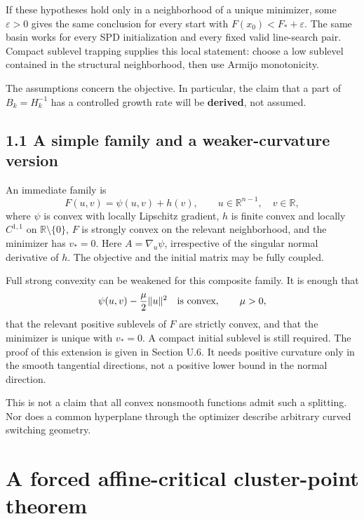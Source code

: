 If these hypotheses hold only in a neighborhood of a unique minimizer,
some \(\varepsilon>0\) gives the same conclusion for every start with
\(F(x_0)<F_*+\varepsilon\). The same basin works for every SPD
initialization and every fixed valid line-search pair. Compact sublevel
trapping supplies this local statement: choose a low sublevel contained
in the structural neighborhood, then use Armijo monotonicity.

The assumptions concern the objective. In particular, the claim that a
part of \(B_k=H_k^{-1}\) has a controlled growth rate will be
\textbf{derived}, not assumed.

\subsection{1.1 A simple family and a weaker-curvature
version}\label{U:a-simple-family-and-a-weaker-curvature-version}

An immediate family is \[
 \boxed{F(u,v)=\psi(u,v)+h(v),\qquad u\in\mathbb R^{n-1},\quad v\in\mathbb R,}
\] where \(\psi\) is convex with locally Lipschitz gradient, \(h\) is
finite convex and locally \(C^{1,1}\) on \(\mathbb R\setminus\{0\}\),
\(F\) is strongly convex on the relevant neighborhood, and the minimizer
has \(v_*=0\). Here \(A=\nabla_u\psi\), irrespective of the singular
normal derivative of \(h\). The objective and the initial matrix may be
fully coupled.

Full strong convexity can be weakened for this composite family. It is
enough that \[
 \psi(u,v)-\frac{\mu}{2}\|u\|^2\quad\hbox{is convex},\qquad \mu>0,
\] that the relevant positive sublevels of \(F\) are strictly convex,
and that the minimizer is unique with \(v_*=0\). A compact initial
sublevel is still required. The proof of this extension is given in
Section U.6. It needs positive curvature only in the smooth tangential
directions, not a positive lower bound in the normal direction.

This is not a claim that all convex nonsmooth functions admit such a
splitting. Nor does a common hyperplane through the optimizer describe
arbitrary curved switching geometry.


\setcounter{section}{1}
\setcounter{theorem}{0}
\setcounter{lemma}{0}
\setcounter{corollary}{0}
\setcounter{proposition}{0}
\setcounter{remark}{0}
\setcounter{equation}{0}
\section{A forced affine-critical cluster-point
theorem}\label{U:a-forced-affine-critical-cluster-point-theorem}

